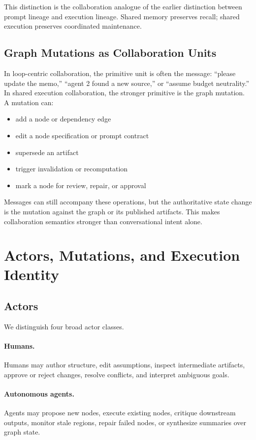 \documentclass{article}
\begin{document}
This distinction is the collaboration analogue of the earlier distinction between prompt lineage and execution lineage. Shared memory preserves recall; shared execution preserves coordinated maintenance.

\subsection{Graph Mutations as Collaboration Units}

In loop-centric collaboration, the primitive unit is often the message: ``please update the memo,'' ``agent 2 found a new source,'' or ``assume budget neutrality.'' In shared execution collaboration, the stronger primitive is the graph mutation. A mutation can:
\begin{itemize}
\item add a node or dependency edge
\item edit a node specification or prompt contract
\item supersede an artifact
\item trigger invalidation or recomputation
\item mark a node for review, repair, or approval
\end{itemize}

Messages can still accompany these operations, but the authoritative state change is the mutation against the graph or its published artifacts. This makes collaboration semantics stronger than conversational intent alone.

\section{Actors, Mutations, and Execution Identity}

\subsection{Actors}

We distinguish four broad actor classes.

\paragraph{Humans.}
Humans may author structure, edit assumptions, inspect intermediate artifacts, approve or reject changes, resolve conflicts, and interpret ambiguous goals.

\paragraph{Autonomous agents.}
Agents may propose new nodes, execute existing nodes, critique downstream outputs, monitor stale regions, repair failed nodes, or synthesize summaries over graph state.
\end{document}

